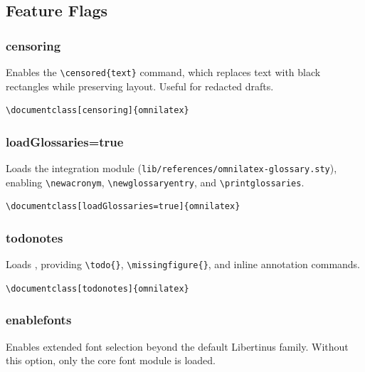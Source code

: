 \subsection{Feature Flags}

\subsubsection{\textsf{censoring}}

Enables the \texttt{\textbackslash censored\{text\}} command, which
replaces text with black rectangles while preserving layout.  Useful for
redacted drafts.

\begin{verbatim}
\documentclass[censoring]{omnilatex}
\end{verbatim}

\subsubsection{\textsf{loadGlossaries=true}}

Loads the  integration module
(\texttt{lib/references/omnilatex-glossary.sty}), enabling
\texttt{\textbackslash newacronym}, \texttt{\textbackslash newglossaryentry},
and \texttt{\textbackslash printglossaries}.

\begin{verbatim}
\documentclass[loadGlossaries=true]{omnilatex}
\end{verbatim}

\subsubsection{\textsf{todonotes}}

Loads , providing
\texttt{\textbackslash todo\{\}}, \texttt{\textbackslash missingfigure\{\}},
and inline annotation commands.

\begin{verbatim}
\documentclass[todonotes]{omnilatex}
\end{verbatim}

\subsubsection{\textsf{enablefonts}}

Enables extended font selection beyond the default Libertinus family.
Without this option, only the core font module is loaded.

